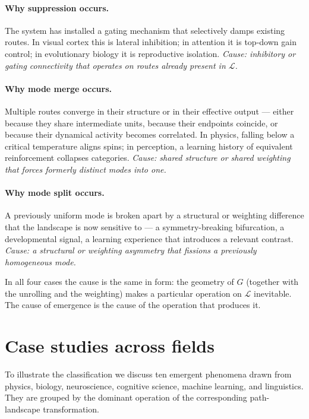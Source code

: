 \documentclass[11pt,a4paper]{article}
\begin{document}
\paragraph{Why suppression occurs.} The system has installed a
gating mechanism that selectively damps existing routes. In
visual cortex this is lateral inhibition; in attention it is
top-down gain control; in evolutionary biology it is reproductive
isolation. \emph{Cause: inhibitory or gating connectivity that
operates on routes already present in $\mathcal{L}$.}

\paragraph{Why mode merge occurs.} Multiple routes converge in
their structure or in their effective output --- either because
they share intermediate units, because their endpoints coincide,
or because their dynamical activity becomes correlated. In
physics, falling below a critical temperature aligns spins; in
perception, a learning history of equivalent reinforcement
collapses categories. \emph{Cause: shared structure or shared
weighting that forces formerly distinct modes into one.}

\paragraph{Why mode split occurs.} A previously uniform mode is
broken apart by a structural or weighting difference that the
landscape is now sensitive to --- a symmetry-breaking bifurcation,
a developmental signal, a learning experience that introduces a
relevant contrast. \emph{Cause: a structural or weighting
asymmetry that fissions a previously homogeneous mode.}

In all four cases the cause is the same in form: the geometry of
$G$ (together with the unrolling and the weighting) makes a
particular operation on $\mathcal{L}$ inevitable. The cause of
emergence is the cause of the operation that produces it.

\section{Case studies across fields}

To illustrate the classification we discuss ten emergent phenomena
drawn from physics, biology, neuroscience, cognitive science,
machine learning, and linguistics. They are grouped by the
dominant operation of the corresponding path-landscape
transformation.
\end{document}
